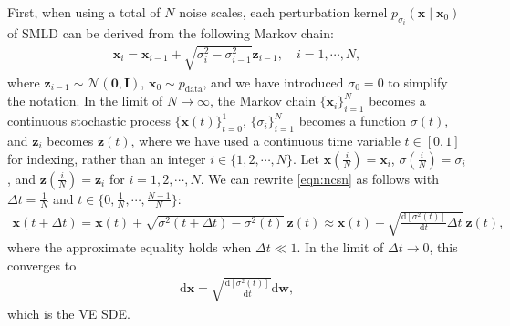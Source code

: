 \documentclass{article} %
\newcommand{\ud}{\mathrm{d}}
\newcommand{\mcal}{\mathcal}
\newcommand{\bfx}{\mathbf{x}}
\newcommand{\bfw}{\mathbf{w}}
\newcommand{\bfz}{\mathbf{z}}
\newcommand{\bfI}{\mathbf{I}}
\newcommand{\bfzero}{\mathbf{0}}
\begin{document}
First, when using a total of $N$ noise scales, each perturbation kernel $p_{\sigma_i}(\bfx \mid \bfx_0)$ of SMLD can be derived from the following Markov chain:
\begin{align}
\bfx_i = \bfx_{i-1} + \sqrt{\sigma_{i}^2 - \sigma_{i-1}^2} \bfz_{i-1}, \quad i=1,\cdots,N \label{eqn:ncsn},
\end{align}
where $\bfz_{i-1} \sim \mcal{N}(\bfzero, \bfI)$, $\bfx_0 \sim p_\text{data}$, and we have introduced $\sigma_0 = 0$ to simplify the notation.
In the limit of $N \to \infty$, the Markov chain $\{\bfx_i\}_{i=1}^N$ becomes a continuous stochastic process $\{\bfx(t)\}_{t=0}^1$, $\{\sigma_i\}_{i=1}^N$ becomes a function $\sigma(t)$, and $\bfz_i$ becomes $\bfz(t)$, where we have used a continuous time variable $t \in [0, 1]$ for indexing, rather than an integer $i \in \{1, 2, \cdots, N\}$. 
Let $\bfx\left(\frac{i}{N}\right) = \bfx_i$, $\sigma\left(\frac{i}{N}\right) = \sigma_i$, and $\bfz\left(\frac{i}{N}\right) = \bfz_i$ for $i=1,2,\cdots, N$. We can rewrite \cref{eqn:ncsn} as follows with $\Delta t = \frac{1}{N}$ and $t \in \big\{0, \frac{1}{N}, \cdots, \frac{N-1}{N}\big\}$:
\begin{align*}
    \bfx(t + \Delta t) = \bfx(t) + \sqrt{\sigma^2(t + \Delta t)- \sigma^2(t)}~\bfz(t) \approx \bfx(t) + \sqrt{\frac{\ud \left[ \sigma^2(t) \right] }{\ud t}\Delta t} ~\bfz(t),
\end{align*}
where the approximate equality holds when $\Delta t \ll 1$. 
In the limit of $\Delta t \rightarrow 0$, this converges to
\begin{align}
\ud \bfx = \sqrt{\frac{\ud \left[ \sigma^2(t) \right]}{\ud t}}\ud \bfw, \label{eqn:ncsn_sde_2}
\end{align}
which is the VE SDE. %
\end{document}
